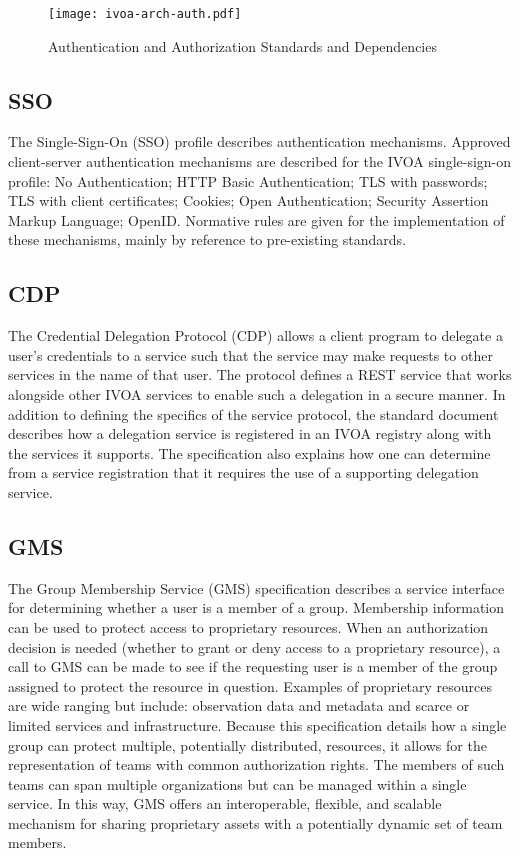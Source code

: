 \documentclass[11pt,letter]{ivoa}
\begin{document}
\begin{figure}[ht]
\centering
\texttt{[image: ivoa-arch-auth.pdf]}
\caption{Authentication and Authorization Standards and Dependencies}
\label{fig:authdeps}
\end{figure}

\subsection{SSO}

The Single-Sign-On (SSO) \citep{2017ivoa.spec.0524T} profile describes
authentication mechanisms. Approved client-server
authentication mechanisms are described for the IVOA single-sign-on
profile: No Authentication;
HTTP Basic Authentication; TLS with passwords; TLS with client
certificates; Cookies; Open
Authentication; Security Assertion Markup Language; OpenID. Normative
rules are given for
the implementation of these mechanisms, mainly by reference to
pre-existing standards.

\subsection{CDP}

The Credential Delegation Protocol (CDP) \citep{2010ivoa.spec.0218P}
allows a client program to delegate a user's credentials
to a service such that the service may make requests to other services
in the name of that
user. The protocol defines a REST service that works alongside other IVOA
services to enable
such a delegation in a secure manner. In addition to defining the
specifics of the service
protocol, the standard document describes how a delegation service is
registered in an IVOA registry
along with the services it supports. The specification also explains how
one can determine
from a service registration that it requires the use of a supporting
delegation service.

\subsection{GMS}

The Group Membership Service (GMS) \citep{2022ivoa.spec.0222M}
specification describes a service interface for determining 
whether a user is a member of a group. Membership information can be
used to protect access to
proprietary resources. When an authorization decision is needed (whether
to grant or deny access
to a proprietary resource), a call to GMS can be made to see if the
requesting user is a member
of the group assigned to protect the resource in question. Examples of
proprietary resources are
wide ranging but include: observation data and metadata and scarce or
limited services and
infrastructure. Because this specification details how a single group
can protect multiple,
potentially distributed, resources, it allows for the representation of
teams with common
authorization rights. The members of such teams can span multiple
organizations but can be
managed within a single service. In this way, GMS offers an
interoperable, flexible, and
scalable mechanism for sharing proprietary assets with a potentially
dynamic set of team members.
\end{document}
